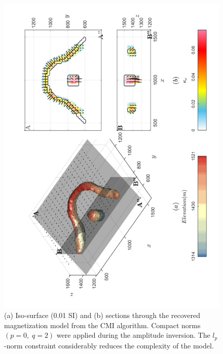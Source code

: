 \begin{figure}[h!]
\centering
\includegraphics[scale=0.52, angle =270]{3D_Inv_l0l1_model_AMI.pdf}
\caption{ (a) Iso-surface (0.01 SI) and (b) sections through the recovered magnetization model from the CMI algorithm. Compact norms $(p = 0,\; q = 2)$ were applied during the amplitude inversion. The $l_p$-norm constraint considerably reduces the complexity of the model.}
\label{fig:3D_Inv_l0l1_model_AMI}
\end{figure}
